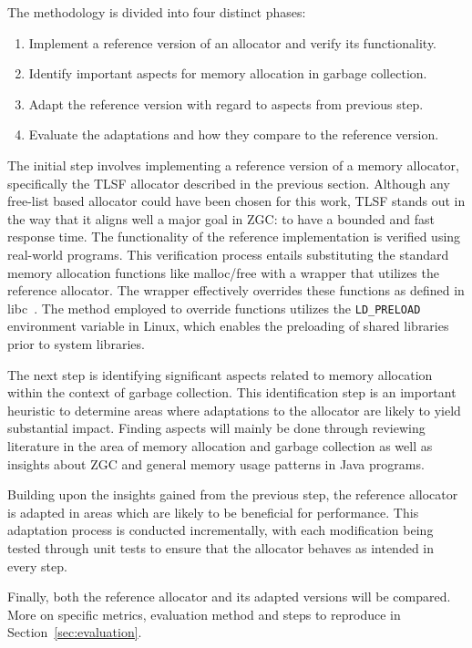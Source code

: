
The methodology is divided into four distinct phases:

\begin{enumerate}
    \item Implement a reference version of an allocator and verify its functionality.
    \item Identify important aspects for memory allocation in garbage collection.
    \item Adapt the reference version with regard to aspects from previous step.
    \item Evaluate the adaptations and how they compare to the reference version.
\end{enumerate}

The initial step involves implementing a reference version of a memory allocator, specifically the TLSF allocator described in the previous section. Although any free-list based allocator could have been chosen for this work, TLSF stands out in the way that it aligns well a major goal in ZGC: to have a bounded and fast response time. The functionality of the reference implementation is verified using real-world programs. This verification process entails substituting the standard memory allocation functions like malloc/free with a wrapper that utilizes the reference allocator. The wrapper effectively overrides these functions as defined in libc~\cite{mallocman}. The method employed to override functions utilizes the \texttt{LD\_PRELOAD} environment variable in Linux, which enables the preloading of shared libraries prior to system libraries.

The next step is identifying significant aspects related to memory allocation within the context of garbage collection. This identification step is an important heuristic to determine areas where adaptations to the allocator are likely to yield substantial impact. Finding aspects will mainly be done through reviewing literature in the area of memory allocation and garbage collection as well as insights about ZGC and general memory usage patterns in Java programs.

Building upon the insights gained from the previous step, the reference allocator is adapted in areas which are likely to be beneficial for performance. This adaptation process is conducted incrementally, with each modification being tested through unit tests to ensure that the allocator behaves as intended in every step.

Finally, both the reference allocator and its adapted versions will be compared. More on specific metrics, evaluation method and steps to reproduce in Section~\ref{sec:evaluation}.


